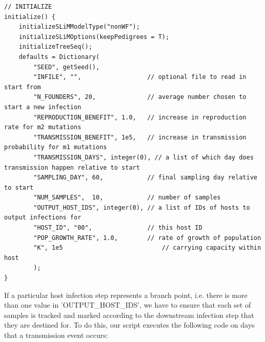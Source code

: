 \documentclass[12pt]{article}
\begin{document}
\begin{verbatim}
// INITIALIZE
initialize() {
	initializeSLiMModelType("nonWF");
	initializeSLiMOptions(keepPedigrees = T);
	initializeTreeSeq();
	defaults = Dictionary(
		"SEED", getSeed(),
		"INFILE", "",                  // optional file to read in start from
		"N_FOUNDERS", 20,              // average number chosen to start a new infection
		"REPRODUCTION_BENEFIT", 1.0,   // increase in reproduction rate for m2 mutations
		"TRANSMISSION_BENEFIT", 1e5,   // increase in transmission probability for m1 mutations
		"TRANSMISSION_DAYS", integer(0), // a list of which day does transmission happen relative to start
		"SAMPLING_DAY", 60,            // final sampling day relative to start
		"NUM_SAMPLES",  10,            // number of samples
		"OUTPUT_HOST_IDS", integer(0), // a list of IDs of hosts to output infections for
		"HOST_ID", "00",               // this host ID
		"POP_GROWTH_RATE", 1.0,        // rate of growth of population
		"K", 1e5     				       // carrying capacity within host
		);
}
\end{verbatim}

If a particular host infection step represents a branch point, i.e. there is more than one value in 'OUTPUT_HOST_IDS', we have to ensure that each set of samples is tracked
and marked according to the downstream infection step that they are destined for. To do this, our script executes the following code on days that a transmission event occurs:
\end{document}
